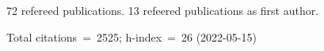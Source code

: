 72 refereed publications. 13 refeered publications as first author.

Total citations~=~2525; h-index~=~26 (2022-05-15)